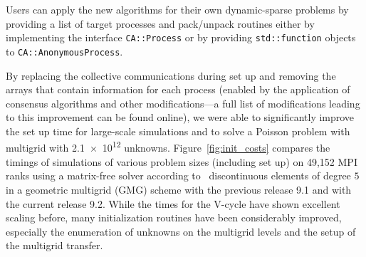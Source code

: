 \documentclass{ansarticle-preprint}
\begin{document}

Users can apply the new algorithms for their own dynamic-sparse problems by
providing a list of target
processes and pack/unpack routines either by implementing the interface
\texttt{CA::\allowbreak Process} or by providing \texttt{std::function}
objects to \texttt{CA::AnonymousProcess}.


By replacing the collective communications during set up and removing the arrays
that contain information for each process (enabled by the application of consensus
algorithms and other modifications---a full list of modifications leading to this
improvement can be found online), we were able to significantly
improve the set up
time for large-scale simulations and to solve a Poisson problem with multigrid
with \num{2.1e12} unknowns.
Figure~\ref{fig:init_costs} compares the timings of simulations of various problem
sizes (including set up) on 49,152 MPI ranks using a matrix-free solver according
to~\cite{KronbichlerKormann2019,KronbichlerWall2018} discontinuous elements of
degree $5$ in a geometric multigrid (GMG) scheme with the previous release 9.1
and with the current release 9.2. While the times for the V-cycle have shown
excellent scaling before, many initialization routines have been considerably
improved, especially the enumeration of unknowns on the multigrid levels and
the setup of the multigrid transfer.
\end{document}
